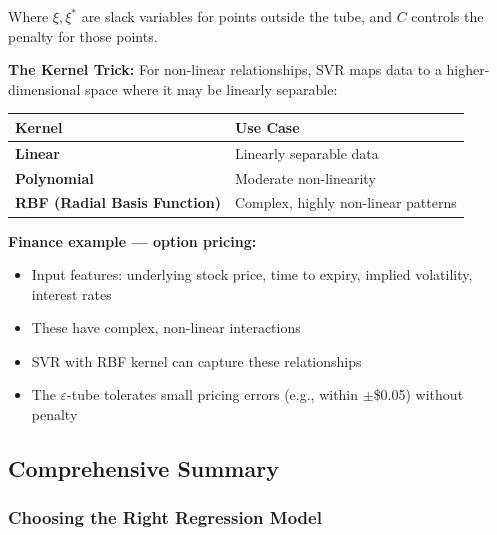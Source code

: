 \documentclass[12pt,openany]{book}
\begin{document}
Where \(\xi, \xi^*\) are slack variables for points outside the tube, and \(C\) controls the penalty for those points.

\textbf{The Kernel Trick:} For non-linear relationships, SVR maps data to a higher-dimensional space where it may be linearly separable:

\begin{center}
\small
\renewcommand{\arraystretch}{1.15}
\begin{tabular}{|L{0.28\textwidth}|L{0.60\textwidth}|}
\hline
    Kernel & Use Case \\
\hline
    \textbf{Linear} & Linearly separable data \\
\hline
    \textbf{Polynomial} & Moderate non-linearity \\
\hline
    \textbf{RBF (Radial Basis Function)} & Complex, highly non-linear patterns \\
\hline
\end{tabular}
\end{center}
\normalsize


\textbf{Finance example --- option pricing:}
\begin{itemize}[leftmargin=*]
    \item Input features: underlying stock price, time to expiry, implied volatility, interest rates
    \item These have complex, non-linear interactions
    \item SVR with RBF kernel can capture these relationships
    \item The \(\varepsilon\)-tube tolerates small pricing errors (e.g., within \(\pm\)\$0.05) without penalty

\end{itemize}

\medskip


\subsection{Comprehensive Summary}


\subsubsection{Choosing the Right Regression Model}
\end{document}
